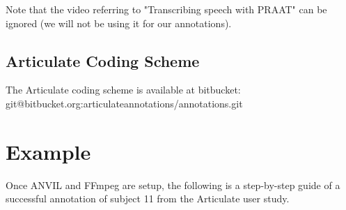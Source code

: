 \documentclass[]{article}
\begin{document}
Note that the video referring to "Transcribing speech with PRAAT" can be ignored (we will not be using it for our annotations).

\subsection{Articulate Coding Scheme}
The Articulate coding scheme is available at bitbucket: \\ git@bitbucket.org:articulateannotations/annotations.git

\section{Example}
Once ANVIL and FFmpeg are setup, the following is a step-by-step guide of a successful annotation of subject 11 from the Articulate user study.
\end{document}

